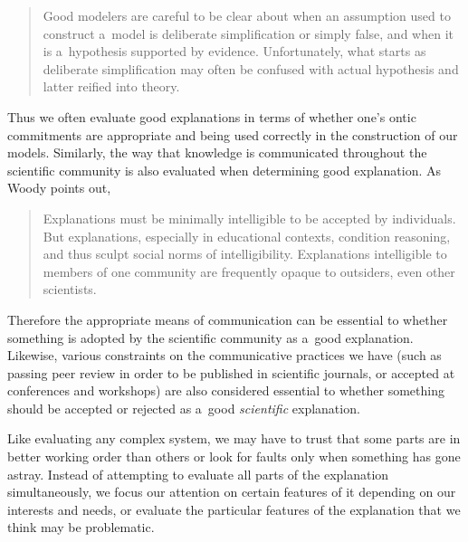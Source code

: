 \begin{quotation}
Good modelers are careful to be clear about when an assumption used to construct a~model is deliberate simplification or simply false, and when it is a~hypothesis supported by evidence. Unfortunately, what starts as deliberate simplification may often be confused with actual hypothesis and latter reified into theory.

\end{quotation}
Thus we often evaluate good explanations in terms of whether one's ontic commitments are appropriate and being used correctly in the construction of our models. Similarly, the way that knowledge is communicated throughout the scientific community is also evaluated when determining good explanation. As Woody
\parencite*[][p.85]{woody_re-orienting_2015} %
 points out,

\begin{quotation}
Explanations must be minimally intelligible to be accepted by individuals. But explanations, especially in educational contexts, condition reasoning, and thus sculpt social norms of intelligibility. Explanations intelligible to members of one community are frequently opaque to outsiders, even other scientists.

\end{quotation}
Therefore the appropriate means of communication can be essential to whether something is adopted by the scientific community as a~good explanation. Likewise, various constraints on the communicative practices we have (such as passing peer review in order to be published in scientific journals, or accepted at conferences and workshops) are also considered essential to whether something should be accepted or rejected as a~good \textit{scientific} explanation.

Like evaluating any complex system, we may have to trust that some parts are in better working order than others or look for faults only when something has gone astray. Instead of attempting to evaluate all parts of the explanation simultaneously, we focus our attention on certain features of it depending on our interests and needs, or evaluate the particular features of the explanation that we think may be problematic.

